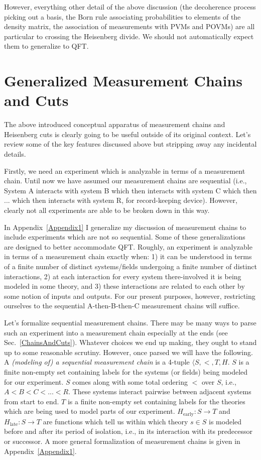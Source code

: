 \documentclass[prd,twocolumn,superscriptaddress,floatfix,amsmath,amssymb,amsfonts,nofootinbib]{revtex4-2}
\begin{document}
However, everything other detail of the above discussion (the decoherence process picking out a basis, the Born rule associating probabilities to elements of the density matrix, the association of measurements with PVMs and POVMs) are all particular to crossing the Heisenberg divide. We should not automatically expect them to generalize to QFT.

\section{Generalized Measurement Chains and Cuts}\label{GenChainsAndCuts}
The above introduced conceptual apparatus of measurement chains and Heisenberg cuts is clearly going to be useful outside of its original context. Let's review some of the key features discussed above but stripping away any incidental details.

Firstly, we need an experiment which is analyzable in terms of a measurement chain. Until now we have assumed our measurement chains are sequential (i.e., System A interacts with system B which then interacts with system C which then ... which then interacts with system R, for record-keeping device). However, clearly not all experiments are able to be broken down in this way. 

In Appendix~\ref{Appendix1} I generalize my discussion of measurement chains to include experiments which are not so sequential. Some of these generalizations are designed to better accommodate QFT. Roughly, an experiment is analyzable in terms of a measurement chain exactly when: 1) it can be understood in terms of a finite number of distinct systems/fields undergoing a finite number of distinct interactions, 2) at each interaction for every system there-involved it is being modeled in some theory, and 3) these interactions are related to each other by some notion of inputs and outputs. For our present purposes, however, restricting ourselves to the sequential A-then-B-then-C measurement chains will suffice.

Let's formalize sequential measurement chains. There may be many ways to parse such an experiment into a measurement chain especially at the ends (see Sec.~\ref{ChainsAndCuts}). Whatever choices we end up making, they ought to stand up to some reasonable scrutiny. However, once parsed we will have the following. A \textit{(modeling of) a sequential measurement chain} is a 4-tuple \mbox{$\langle S,<,T,H$}. $S$ is a finite non-empty set containing labels for the systems (or fields) being modeled for our experiment. $S$ comes along with some total ordering $<$ over $S$, i.e.,  $A<B<C<...<R$. These systems interact pairwise between adjacent systems from start to end. $T$ is a finite non-empty set containing labels for the theories which are being used to model parts of our experiment. $H_\text{early}:S\to T$ and $H_\text{late}:S\to T$ are functions which tell us within which theory $s\in S$ is modeled before and after its period of isolation, i.e., in its interaction with its predecessor or successor. A more general formalization of measurement chains is given in Appendix~\ref{Appendix1}.
\end{document}
